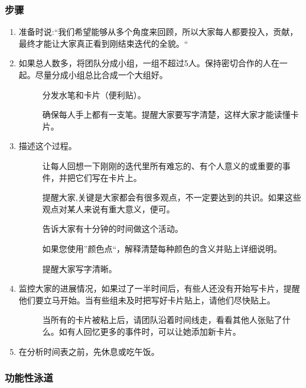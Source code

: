 \hypertarget{ux6b65ux9aa4-1}{%
\subsubsection{步骤}\label{ux6b65ux9aa4-1}}

\begin{enumerate}
\tightlist
\item
  准备时说:``我们希望能够从多个角度来回顾，所以大家每人都要投入，贡献，最终才能让大家真正看到刚结束迭代的全貌。``
\item
  如果总人数多，将团队分成小组，一组不超过5人。保持密切合作的人在一起。尽量分成小组总比合成一个大组好。

  \begin{description}
  \item[]
  分发水笔和卡片（便利贴）。

  确保每人手上都有一支笔。提醒大家要写字清楚，这样大家才能读懂卡片。
  \end{description}
\item
  描述这个过程。

  \begin{description}
  \item[]
  让每人回想一下刚刚的迭代里所有难忘的、有个人意义的或重要的事件，并把它们写在卡片上。

  提醒大家,关键是大家都会有很多观点，不一定要达到的共识。如果这些观点对某人来说有重大意义，便可。

  告诉大家有十分钟的时间做这个活动。

  如果您使用''颜色点``，解释清楚每种颜色的含义并贴上详细说明。

  提醒大家写字清晰。
  \end{description}
\item
  监控大家的进展情况，如果过了一半时间后，有些人还没有开始写卡片，提醒他们要立马开始。当有些组未及时把写好卡片贴上，请他们尽快贴上。

  \begin{description}
  \item[]
  当所有的卡片被粘上后，请团队沿着时间线走，看看其他人张贴了什么。如有人回忆更多的事件时，可以让她添加新卡片。
  \end{description}
\item
  在分析时间表之前，先休息或吃午饭。
\end{enumerate}

\hypertarget{ux529fux80fdux6027ux6cf3ux9053}{%
\subsubsection{功能性泳道}\label{ux529fux80fdux6027ux6cf3ux9053}}

